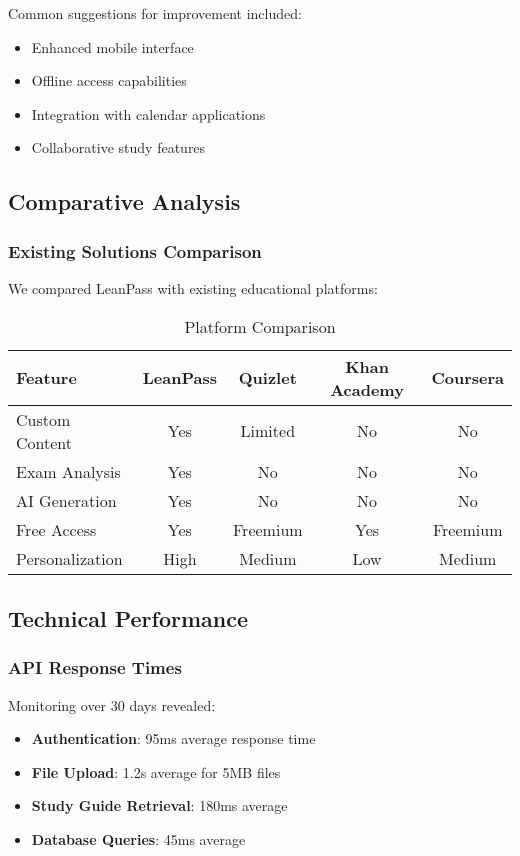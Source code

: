 \documentclass[conference]{IEEEtran}
\begin{document}
Common suggestions for improvement included:
\begin{itemize}
\item Enhanced mobile interface
\item Offline access capabilities
\item Integration with calendar applications
\item Collaborative study features
\end{itemize}

\subsection{Comparative Analysis}

\subsubsection{Existing Solutions Comparison}
We compared LeanPass with existing educational platforms:

\begin{table}[htbp]
\caption{Platform Comparison}
\begin{center}
\begin{tabular}{|l|c|c|c|c|}
\hline
\textbf{Feature} & \textbf{LeanPass} & \textbf{Quizlet} & \textbf{Khan Academy} & \textbf{Coursera} \\
\hline
Custom Content & Yes & Limited & No & No \\
Exam Analysis & Yes & No & No & No \\
AI Generation & Yes & No & No & No \\
Free Access & Yes & Freemium & Yes & Freemium \\
Personalization & High & Medium & Low & Medium \\
\hline
\end{tabular}
\end{center}
\label{tab:comparison}
\end{table}

\subsection{Technical Performance}

\subsubsection{API Response Times}
Monitoring over 30 days revealed:
\begin{itemize}
\item \textbf{Authentication}: 95ms average response time
\item \textbf{File Upload}: 1.2s average for 5MB files
\item \textbf{Study Guide Retrieval}: 180ms average
\item \textbf{Database Queries}: 45ms average
\end{itemize}
\end{document}
